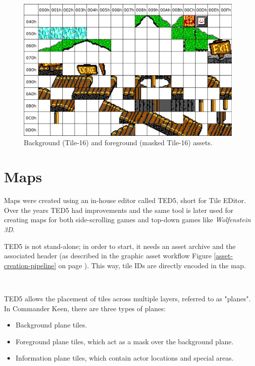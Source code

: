 \documentclass[book.tex]{subfiles}
\begin{document}
\begin{figure}[H] 
  \centering 
  \includegraphics[width=0.99\textwidth, frame]{screenshots_300dpi/tile16M_assets.png}
  \caption{Background (Tile-16) and foreground (masked Tile-16) assets.}
  \label{fig:tile16_assets}
\end{figure} 



\section{Maps}
Maps were created using an in-house editor called TED5, short for Tile EDitor. Over the years TED5 had improvements and the same tool is later used for creating maps for both side-scrolling games and top-down games like \textit{Wolfenstein 3D}.\\
\par
 TED5 is not stand-alone; in order to start, it needs an asset archive and the  associated header (as described in the graphic asset workflow Figure \ref{asset-creation-pipeline} on page \pageref{asset-creation-pipeline}). This way, tile IDs are directly encoded in the map.\\

 \par
{}\\
 
 \par
TED5 allows the placement of tiles across multiple layers, referred to as "planes". In Commander Keen, there are three types of planes: 
\begin{itemize}
  \item Background plane tiles.
  \item Foreground plane tiles, which act as a mask over the background plane.
  \item Information plane tiles, which contain actor locations and special areas.
\end{itemize}
\end{document}
